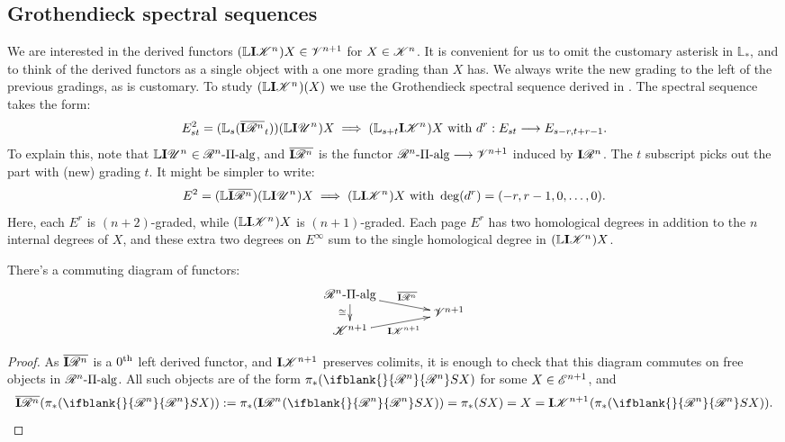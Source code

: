 \documentclass[11pt]{article}
\newcommand{\GS}[1]{\scrE^{#1}}
\newcommand{\PRLie}[1]{\scrR^{#1}}%
\newcommand{\LL}[1]{{\scrK}^{#1}}%
\newcommand{\GR}[1]{\scrV^{#1}}%
\newcommand{\nontop}[1]{\scrU^{#1}}%
\newcommand{\PiAlg}[1]{#1\textup{-$\Pi$-alg}}
\newcommand{\Ind}[2][]{\mathbf{I}{#2}_{#1}}%
\newcommand{\Fr}[2][]{\ifblank{#1}{#2}{#2_{#1}}}
\newcommand{\derived}{\mathbb{L}}
\begin{document}
\begin{GrothendieckSpectralSequences}
\subsection{Grothendieck spectral sequences}
We are interested in the derived functors $(\derived\Ind{\LL{n}})X\in\GR{n+1}$ for $X\in\LL{n}$. It is convenient for us to omit the customary asterisk in $\derived_*$, and to think of the derived functors as a single object with a one more grading than $X$ has. We always write the new grading to the left of the previous gradings, as is customary. To study $(\derived\Ind{\LL{n}})(X)$ we use the Grothendieck spectral sequence derived in \cite{Blanc_Stover-Groth_SS.pdf}. The spectral sequence takes the form:
\[E^2_{st}=(\derived_s(\overline{\Ind{\PRLie{n}}}_t))(\derived\Ind{\nontop{n}})X\implies(\derived_{s+t}\Ind{\LL{n}})X\textup{ with }d^{r}:E_{st}\to E_{s-r,t+r-1}.\]
To explain this, note that $\derived\Ind{\nontop{n}}\in\PiAlg{\PRLie{n}}$, and $\overline{\Ind{\PRLie{n}}}$ is the functor $\PiAlg{\PRLie{n}}\to\GR{n+1}$ induced by $\Ind{\PRLie{n}}$. The $t$ subscript picks out the part with (new) grading $t$. It might be simpler to write:
\[E^2=(\derived\overline{\Ind{\PRLie{n}}})(\derived\Ind{\nontop{n}})X\implies(\derived\Ind{\LL{n}})X\textup{ with }\deg(d^r)=(-r,r-1,0,\ldots,0).\]
Here, each $E^r$ is $(n+2)$-graded, while $(\derived\Ind{\LL{n}})X$ is $(n+1)$-graded. Each page $E^r$ has two homological degrees in addition to the $n$ internal degrees of $X$, and these extra two degrees on $E^\infty$ sum to the single homological degree in $(\derived\Ind{\LL{n}})X$.
\begin{prop*}
There's a commuting diagram of functors:
\[\xymatrix@R=0mm@C=14mm{
\PiAlg{\PRLie{n}}
\ar[dr]^-{\overline{\Ind{\PRLie{n}}}}
\ar[dd]_-{\cong}
&%
\\%
&%
\GR{n+1}\\%
\LL{n+1}
\ar[ur]_-{\Ind{\LL{n+1}}}
&%
}\]
\end{prop*}
\begin{proof}
As $\overline{\Ind{\PRLie{n}}}$ is a $0^\textup{th}$ left derived functor, and $\Ind{\LL{n+1}}$ preserves colimits, it is enough to check that this diagram commutes on free objects in $\PiAlg{\PRLie{n}}$. All such objects are of the form $\pi_*(\Fr{\PRLie{n}}SX)$ for some $X\in\GS{n+1}$, and
\[\overline{\Ind{\PRLie{n}}}(\pi_*(\Fr{\PRLie{n}}SX)):=\pi_*(\Ind{\PRLie{n}}(\Fr{\PRLie{n}}SX))=\pi_*(SX)=X=\Ind{\LL{n+1}}(\pi_*(\Fr{\PRLie{n}}SX)).\qedhere\]

\end{proof}
\end{GrothendieckSpectralSequences}
\end{document}
